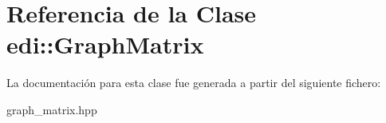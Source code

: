 \hypertarget{classedi_1_1GraphMatrix}{}\section{Referencia de la Clase edi\+:\+:Graph\+Matrix}
\label{classedi_1_1GraphMatrix}


La documentación para esta clase fue generada a partir del siguiente fichero\+:\begin{DoxyCompactItemize}
\item 
graph\+\_\+matrix.\+hpp\end{DoxyCompactItemize}
